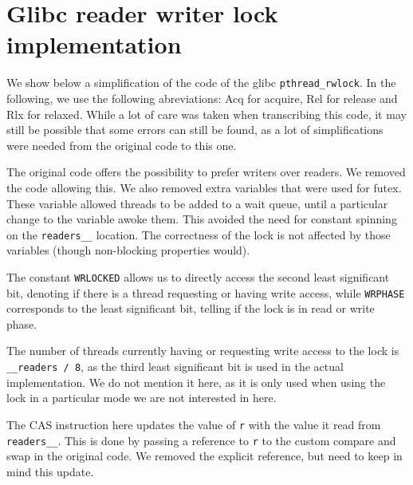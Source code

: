 \chapter{Glibc reader writer lock implementation}
\label{app:glibc}
We show below a simplification of the code of the glibc \texttt{pthread\_rwlock}\cite{glibcRW}. In the following, we use the following abreviations: Acq for acquire, Rel for release and Rlx for relaxed. While a lot of care was taken when transcribing this code, it may still be possible that some errors can still be found, as a lot of simplifications were needed from the original code to this one.

The original code offers the possibility to prefer writers over readers. We removed the code allowing this. We also removed extra variables that were used for futex. These variable allowed threads to be added to a wait queue, until a particular change to the variable awoke them. This avoided the need for constant spinning on the \texttt{readers\_\_} location. The correctness of the lock is not affected by those variables (though non-blocking properties would).

The constant \texttt{WRLOCKED} allows us to directly access the second least significant bit, denoting if there is a thread requesting or having write access, while \texttt{WRPHASE} corresponds to the least significant bit, telling if the lock is in read or write phase.

The number of threads currently having or requesting write access to the lock is \texttt{\_\_readers / 8}, as the third least significant bit is used in the actual implementation. We do not mention it here, as it is only used when using the lock in a particular mode we are not interested in here. 

The CAS instruction here updates the value of \texttt{r} with the value it read from \texttt{readers\_\_}. This is done by passing a reference to \texttt{r} to the custom compare and swap in the original code. We removed the explicit reference, but need to keep in mind this update.

